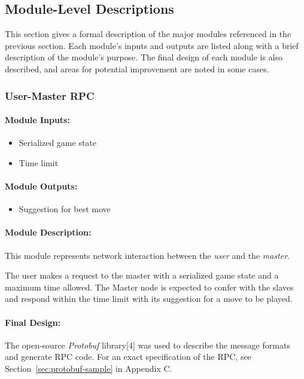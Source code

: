 \documentclass[pdftex,12pt,a4paper]{article}
\begin{document}
%
%
\subsection{Module-Level Descriptions}\label{sec:modules}

This section gives a formal description of the major modules referenced in the previous section. Each module's inputs and outputs are listed along with a brief description of the module's purpose. The final design of each module is also described, and areas for potential improvement are noted in some cases.

\subsubsection{User-Master RPC}

\paragraph{Module Inputs:}
\begin{itemize}
\item Serialized game state
\item Time limit
\end{itemize}

\paragraph{Module Outputs:}
\begin{itemize}
\item Suggestion for best move
\end{itemize}

\paragraph{Module Description:\\}
This module represents network interaction between the \emph{user} and the \emph{master}.

The user makes a request to the master with a serialized game state and a maximum time allowed. The Master node is expected to confer with the slaves and respond within the time limit with its suggestion for a move to be played.

\paragraph{Final Design:\\}
The open-source \emph{Protobuf} library[4] was used to describe the message formats and generate RPC code. For an exact specification of the RPC, see Section~\ref{sec:protobuf-sample} in Appendix C.
\end{document}
